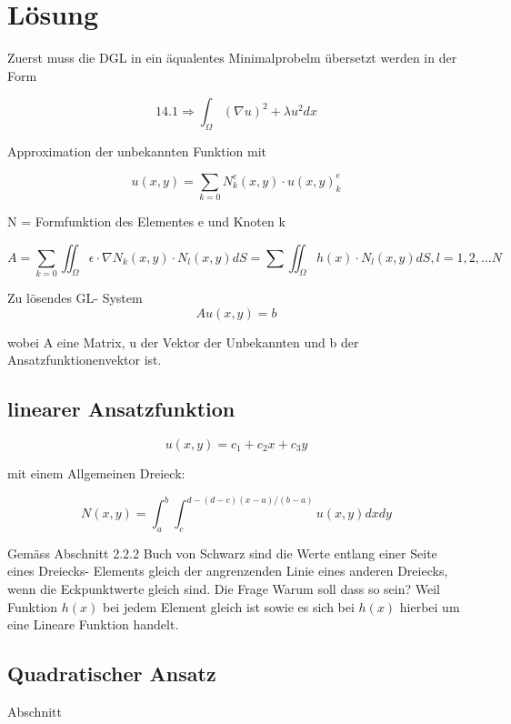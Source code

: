 %
%
%
\section{Lösung
\label{fem:section:loesung}}
Zuerst muss die DGL in ein äqualentes Minimalprobelm übersetzt werden in der Form

\begin{equation}
14.1 \Rightarrow \int_\Omega (\nabla u)^2 +\lambda u^2 dx
\label{fem:equation3}
\end{equation}

Approximation der unbekannten Funktion mit 

\begin{equation}
u(x,y) =  \sum_{k=0} N_k^e(x,y) \cdot u(x,y)_k^e
\label{fem:equation3}
\end{equation}

N = Formfunktion des Elementes e und Knoten k

\begin{equation}
A =  \sum_{k=0} \iint_{\!\!\!\!\!\!\!\Omega} \epsilon \cdot \nabla N_k(x,y) \cdot N_l(x,y) dS = \sum \iint_{\!\!\!\!\!\!\!\Omega} h(x) \cdot N_l(x,y) dS, l = 1,2,...N
\label{fem:equation3}
\end{equation}

Zu lösendes GL- System
\begin{equation}
Au(x,y) = b
\label{fem:GL}
\end{equation}

wobei A eine Matrix, u der Vektor der Unbekannten und b der Ansatzfunktionenvektor ist.

\subsection{linearer Ansatzfunktion
\label{fem:subsection:bonorum}}

\begin{equation}
u(x,y) = c_1 + c_2x + c_3y
\label{fem:equation3}
\end{equation}

mit einem Allgemeinen Dreieck:

\begin{equation}
N(x,y) = \int_a^b\int_c^{d-(d-c)(x-a)/(b-a)} u(x,y) dxdy
\label{fem:Dreieck_alg}
\end{equation}

Gemäss Abschnitt 2.2.2 Buch von Schwarz sind die Werte entlang einer Seite eines Dreiecks- Elements gleich  der angrenzenden Linie eines anderen Dreiecks, wenn die Eckpunktwerte gleich sind. Die Frage Warum soll dass so sein? Weil Funktion $h(x)$ bei jedem Element gleich ist sowie es sich bei $h(x)$ hierbei um eine Lineare Funktion handelt.

\subsection{Quadratischer Ansatz
\label{fem:subsection:bonorum}}
 Abschnitt 

